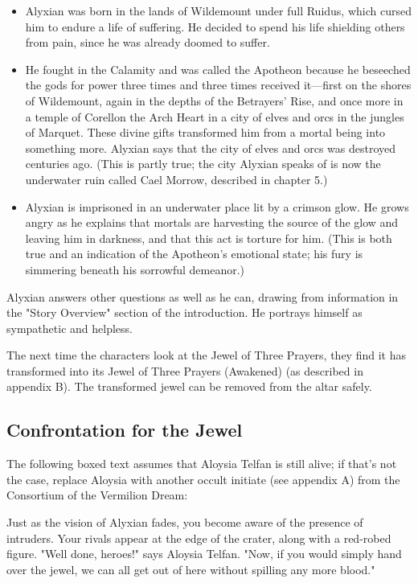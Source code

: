 \documentclass[10pt,a4paper,twoside,bg=print,twocolumn,openany,nodeprecatedcode]{dndbook}
\begin{document}
\begin{itemize}
\item Alyxian was born in the lands of Wildemount under full Ruidus, which cursed him to endure a life of suffering. He decided to spend his life shielding others from pain, since he was already doomed to suffer.
\item He fought in the Calamity and was called the Apotheon because he beseeched the gods for power three times and three times received it—first on the shores of Wildemount, again in the depths of the Betrayers' Rise, and once more in a temple of Corellon the Arch Heart in a city of elves and orcs in the jungles of Marquet. These divine gifts transformed him from a mortal being into something more. Alyxian says that the city of elves and orcs was destroyed centuries ago. (This is partly true; the city Alyxian speaks of is now the underwater ruin called Cael Morrow, described in chapter 5.)
\item Alyxian is imprisoned in an underwater place lit by a crimson glow. He grows angry as he explains that mortals are harvesting the source of the glow and leaving him in darkness, and that this act is torture for him. (This is both true and an indication of the Apotheon's emotional state; his fury is simmering beneath his sorrowful demeanor.)
\end{itemize}

Alyxian answers other questions as well as he can, drawing from information in the "Story Overview" section of the introduction. He portrays himself as sympathetic and helpless.

The next time the characters look at the Jewel of Three Prayers, they find it has transformed into its Jewel of Three Prayers (Awakened) (as described in appendix B). The transformed jewel can be removed from the altar safely.

\subsection{Confrontation for the Jewel}
The following boxed text assumes that Aloysia Telfan is still alive; if that's not the case, replace Aloysia with another occult initiate (see appendix A) from the Consortium of the Vermilion Dream:

\begin{DndReadAloud}{}
Just as the vision of Alyxian fades, you become aware of the presence of intruders. Your rivals appear at the edge of the crater, along with a red-robed figure. "Well done, heroes!" says Aloysia Telfan. "Now, if you would simply hand over the jewel, we can all get out of here without spilling any more blood."

\end{DndReadAloud}
\end{document}
